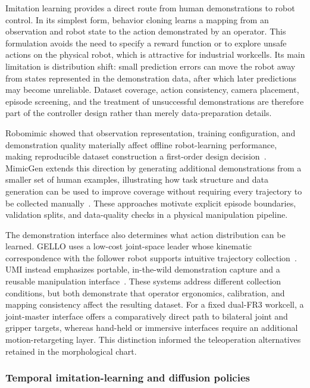 Imitation learning provides a direct route from human demonstrations to robot control. In its simplest form, behavior cloning learns a mapping from an observation and robot state to the action demonstrated by an operator. This formulation avoids the need to specify a reward function or to explore unsafe actions on the physical robot, which is attractive for industrial workcells. Its main limitation is distribution shift: small prediction errors can move the robot away from states represented in the demonstration data, after which later predictions may become unreliable. Dataset coverage, action consistency, camera placement, episode screening, and the treatment of unsuccessful demonstrations are therefore part of the controller design rather than merely data-preparation details.

Robomimic showed that observation representation, training configuration, and demonstration quality materially affect offline robot-learning performance, making reproducible dataset construction a first-order design decision~\cite{robomimic}. MimicGen extends this direction by generating additional demonstrations from a smaller set of human examples, illustrating how task structure and data generation can be used to improve coverage without requiring every trajectory to be collected manually~\cite{mimicgen}. These approaches motivate explicit episode boundaries, validation splits, and data-quality checks in a physical manipulation pipeline.

The demonstration interface also determines what action distribution can be learned. GELLO uses a low-cost joint-space leader whose kinematic correspondence with the follower robot supports intuitive trajectory collection~\cite{gello}. UMI instead emphasizes portable, in-the-wild demonstration capture and a reusable manipulation interface~\cite{umi}. These systems address different collection conditions, but both demonstrate that operator ergonomics, calibration, and mapping consistency affect the resulting dataset. For a fixed dual-FR3 workcell, a joint-master interface offers a comparatively direct path to bilateral joint and gripper targets, whereas hand-held or immersive interfaces require an additional motion-retargeting layer. This distinction informed the teleoperation alternatives retained in the morphological chart.

\subsubsection{Temporal imitation-learning and diffusion policies}


